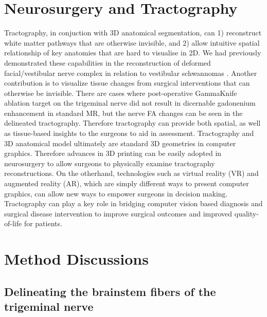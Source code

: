 \section{Neurosurgery and Tractography}

Tractography, in conjuction with 3D anatomical segmentation, can 1) reconstruct white matter pathways that are otherwise invisible, and 2) allow intuitive spatial relationship of key anatomies that are hard to visualise in 2D. We had previously demonstrated these capabilities in the reconstruction of deformed facial/vestibular nerve complex in relation to vestibular schwannomas \cite{Chen2011b,Behan2017}.
Another contribution is to visualize tissue changes from surgical interventions that can otherwise be invisible. There are cases where post-operative GammaKnife ablation target on the trigeminal nerve did not result in dicernable gadonenium enhancement in standard MR, but the nerve FA changes can be seen in the delineated tractography. Therefore tractography can provide both spatial, as well as tissue-based insights to the surgeons to aid in assessment.
Tractography and 3D anatomical model ultimately are standard 3D geometries in computer graphics. Therefore advances in 3D printing can be easily adopted in neurosurgery to allow surgeons to physically examine tractography reconstructions. On the otherhand, technologies such as virtual reality (VR) and augmented reality (AR), which are simply different ways to present computer graphics, can allow new ways to empower surgeons in decision making. Tractography can play a key role in bridging computer vision based diagnosis and surgical disease intervention to improve surgical outcomes and improved quality-of-life for patients.    


\section{Method Discussions}

\subsection{Delineating the brainstem fibers of the trigeminal nerve}

